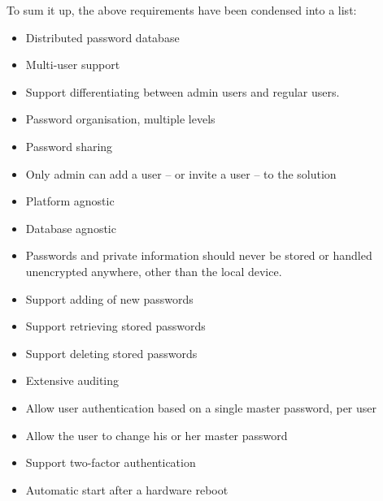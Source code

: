 			To sum it up, the above requirements have been condensed into a list:
			\vspace{-3ex}\begin{itemize}
				\setlength\itemsep{0.1em}
				\item Distributed password database
				\item Multi-user support
				\item Support differentiating between admin users and regular users.
				\item Password organisation, multiple levels
				\item Password sharing
				\item Only admin can add a user -- or invite a user -- to the solution
				\item Platform agnostic
				\item Database agnostic
				\item Passwords and private information should never be stored or handled unencrypted anywhere, other than the local device.
				\item Support adding of new passwords
				\item Support retrieving stored passwords
				\item Support deleting stored passwords
				\item Extensive auditing
				\item Allow user authentication based on a single master password, per user
				\item Allow the user to change his or her master password
				\item Support two-factor authentication
				\item Automatic start after a hardware reboot
			\end{itemize}


